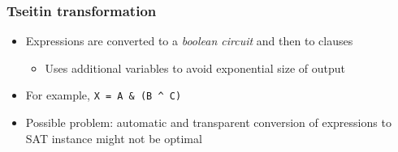 \documentclass{beamer}
\let\olditem\item
\renewcommand{\item}{%
\olditem\vspace{4pt}}
\begin{document}
\begin{frame}
\frametitle{Tseitin transformation}
\begin{itemize}
\item Expressions are converted to a \emph{boolean circuit} and then to clauses
\begin{itemize}
	\item Uses additional variables to avoid exponential size of output
\end{itemize}
\item For example, \texttt{X = A \& (B \^{} C)}
\end{itemize}
\begin{center}
\resizebox{0.75\textwidth}{!}{
  
}
\end{center}
\begin{itemize}
\item Possible problem: automatic and transparent conversion of expressions to SAT instance might not be optimal
\end{itemize}
\end{frame}
\end{document}
